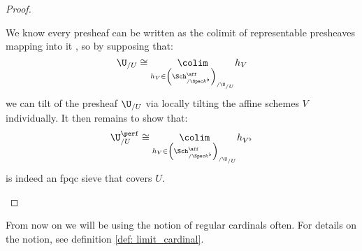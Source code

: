 \begin{proof}
\begin{enumerate}
$$                                    $$
                                We know every presheaf can be written as the colimit of representable presheaves mapping into it \cite[Section 4]{nlab:presheaf}, so by supposing that:
                                    $$\U_{/U} \cong \underset{ h_V \in \left( \Sch^{\aff}_{/\Spec k^{\flat}} \right)_{/\U_{/U}} }{\colim} h_V$$
                                we can tilt of the presheaf $\U_{/U}$ via locally tilting the affine schemes $V$ individually. It then remains to show that:
                                    $$\U_{/U}^{\perf} \cong \underset{ h_V \in \left( \Sch^{\aff}_{/\Spec k^{\flat}} \right)_{/\U_{/U}} }{\colim} h_{V^{\flat}}$$
                                is indeed an fpqc sieve that covers $U$. 
                            \end{enumerate}
                        \end{proof}
                        
                    \begin{remark}
                        From now on we will be using the notion of regular cardinals often. For details on the notion, see definition \ref{def: limit_cardinal}.
                    \end{remark}
                    
